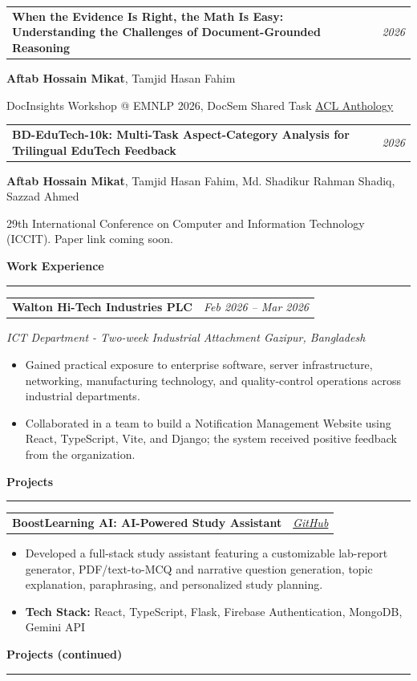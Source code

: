 \documentclass[11pt,a4paper]{article}
\makeatletter
\newcommand{\cvsection}[1]{%
  \needspace{3\baselineskip}%
  \vspace{4pt}%
  {\Large\bfseries #1}\par
  \vspace{2pt}\hrule\vspace{4pt}%
}
\newcommand{\entryheading}[2]{%
  \begin{tabularx}{\textwidth}{@{}>{\raggedright\arraybackslash}X>{\raggedleft\arraybackslash}p{1.55in}@{}}
    \textbf{#1} & \textit{#2}
  \end{tabularx}\vspace{1pt}%
}
\newcommand{\subline}[1]{{\itshape #1}\par}
\newcommand{\tech}[1]{\textbf{Tech Stack:} #1}
\newcommand{\projectheading}[2]{\needspace{6\baselineskip}\entryheading{#1}{#2}}
\makeatother
\begin{document}
\entryheading{When the Evidence Is Right, the Math Is Easy: Understanding the
Challenges of Document-Grounded Reasoning}{2026}
\textbf{Aftab Hossain Mikat}, Tamjid Hasan Fahim\par
{\small DocInsights Workshop @ EMNLP 2026, DocSem Shared Task \hfill \href{https://aclanthology.org/2026.docinsights-1.30/}{ACL Anthology \faExternalLink*}\par}
\vspace{8pt}

\entryheading{BD-EduTech-10k: Multi-Task Aspect-Category Analysis for Trilingual EduTech Feedback}{2026}
\textbf{Aftab Hossain Mikat}, Tamjid Hasan Fahim, Md. Shadikur Rahman Shadiq, Sazzad Ahmed\par
{\small 29th International Conference on Computer and Information Technology (ICCIT). Paper link coming soon.\par}
\endgroup

\cvsection{Work Experience}
\entryheading{Walton Hi-Tech Industries PLC}{Feb 2026 -- Mar 2026}
\subline{ICT Department - Two-week Industrial Attachment \hfill Gazipur, Bangladesh}
\begin{itemize}
  \item Gained practical exposure to enterprise software, server infrastructure, networking,
        manufacturing technology, and quality-control operations across industrial departments.
  \item Collaborated in a team to build a Notification Management Website using React,
        TypeScript, Vite, and Django; the system received positive feedback from the organization.
\end{itemize}

\cvsection{Projects}
\projectheading{BoostLearning AI: AI-Powered Study Assistant}{\href{https://github.com/ahmikat/Smart-Study-Assistant}{GitHub \faExternalLink*}}
\begin{itemize}
  \item Developed a full-stack study assistant featuring a customizable lab-report generator,
        PDF/text-to-MCQ and narrative question generation, topic explanation, paraphrasing, and
        personalized study planning.
  \item \tech{React, TypeScript, Flask, Firebase Authentication, MongoDB, Gemini API}
\end{itemize}

\vspace*{\fill}
\newpage
\vspace*{\fill}
\cvsection{Projects (continued)}
\end{document}
